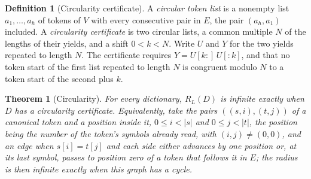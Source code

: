 \documentclass[11pt,a4paper]{article}
\theoremstyle{definition}
\newtheorem{definition}{Definition}
\theoremstyle{plain}
\newtheorem{theorem}{Theorem}
\newcommand{\ripple}{R_{L}}
\begin{document}

\begin{definition}[Circularity certificate]\label{def:circular}
A \emph{circular token list} is a nonempty list \(a_1, \dots, a_h\) of tokens of \(V\) with every consecutive pair in
\(E\), the pair \((a_h, a_1)\) included. A \emph{circularity certificate} is two circular lists, a common multiple \(N\)
of the lengths of their yields, and a shift \(0 < k < N\). Write \(U\) and \(Y\) for the two yields repeated to length
\(N\). The certificate requires \(Y = U[k{:}]\,U[{:}k]\), and that no token start of the first list repeated to length
\(N\) is congruent modulo \(N\) to a token start of the second plus \(k\).
\end{definition}

\begin{theorem}[Circularity]\label{thm:circular}
For every dictionary, \(\ripple(D)\) is infinite exactly when \(D\) has a circularity certificate. Equivalently, take
the pairs \(((s, i), (t, j))\) of a canonical token and a position inside it, \(0 \le i < |s|\) and \(0 \le j < |t|\),
the position being the number of the token's symbols already read, with \((i, j) \ne (0, 0)\), and an edge when
\(s[i] = t[j]\) and each side either advances by one position or, at its last symbol, passes to position zero of a token
that follows it in \(E\); the radius is then infinite exactly when this graph has a cycle.
\end{theorem}
\end{document}
